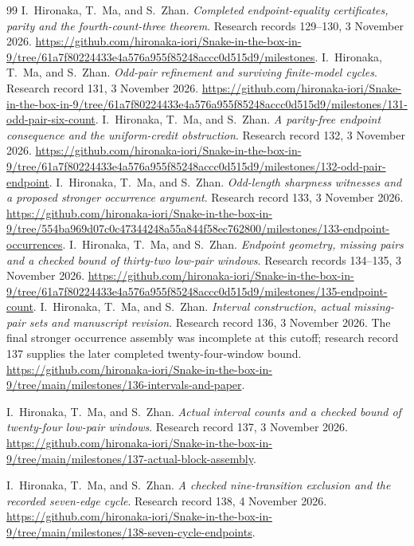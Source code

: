 \documentclass[11pt,a4paper]{article}
\theoremstyle{definition}
\theoremstyle{remark}
\begin{document}
\begin{thebibliography}{99}
I.~Hironaka, T.~Ma, and S.~Zhan. \emph{Completed endpoint-equality certificates, parity and the fourth-count-three theorem}. Research records 129--130, 3 November 2026.
\url{https://github.com/hironaka-iori/Snake-in-the-box-in-9/tree/61a7f80224433e4a576a955f85248accc0d515d9/milestones}.
I.~Hironaka, T.~Ma, and S.~Zhan. \emph{Odd-pair refinement and surviving finite-model cycles}. Research record 131, 3 November 2026.
\url{https://github.com/hironaka-iori/Snake-in-the-box-in-9/tree/61a7f80224433e4a576a955f85248accc0d515d9/milestones/131-odd-pair-six-count}.
I.~Hironaka, T.~Ma, and S.~Zhan. \emph{A parity-free endpoint consequence and the uniform-credit obstruction}. Research record 132, 3 November 2026.
\url{https://github.com/hironaka-iori/Snake-in-the-box-in-9/tree/61a7f80224433e4a576a955f85248accc0d515d9/milestones/132-odd-pair-endpoint}.
I.~Hironaka, T.~Ma, and S.~Zhan. \emph{Odd-length sharpness witnesses and a proposed stronger occurrence argument}. Research record 133, 3 November 2026.
\url{https://github.com/hironaka-iori/Snake-in-the-box-in-9/tree/554ba969d07c0c47344248a55a844f58ec762800/milestones/133-endpoint-occurrences}.
I.~Hironaka, T.~Ma, and S.~Zhan. \emph{Endpoint geometry, missing pairs and a checked bound of thirty-two low-pair windows}. Research records 134--135, 3 November 2026.
\url{https://github.com/hironaka-iori/Snake-in-the-box-in-9/tree/61a7f80224433e4a576a955f85248accc0d515d9/milestones/135-endpoint-count}.
I.~Hironaka, T.~Ma, and S.~Zhan. \emph{Interval construction, actual missing-pair sets and manuscript revision}. Research record 136, 3 November 2026. The final stronger occurrence assembly was incomplete at this cutoff; research record 137 supplies the later completed twenty-four-window bound.
\url{https://github.com/hironaka-iori/Snake-in-the-box-in-9/tree/main/milestones/136-intervals-and-paper}.

I.~Hironaka, T.~Ma, and S.~Zhan. \emph{Actual interval counts and a checked bound of twenty-four low-pair windows}. Research record 137, 3 November 2026.
\url{https://github.com/hironaka-iori/Snake-in-the-box-in-9/tree/main/milestones/137-actual-block-assembly}.

I.~Hironaka, T.~Ma, and S.~Zhan. \emph{A checked nine-transition exclusion and the recorded seven-edge cycle}. Research record 138, 4 November 2026.
\url{https://github.com/hironaka-iori/Snake-in-the-box-in-9/tree/main/milestones/138-seven-cycle-endpoints}.


\end{thebibliography}
\end{document}
